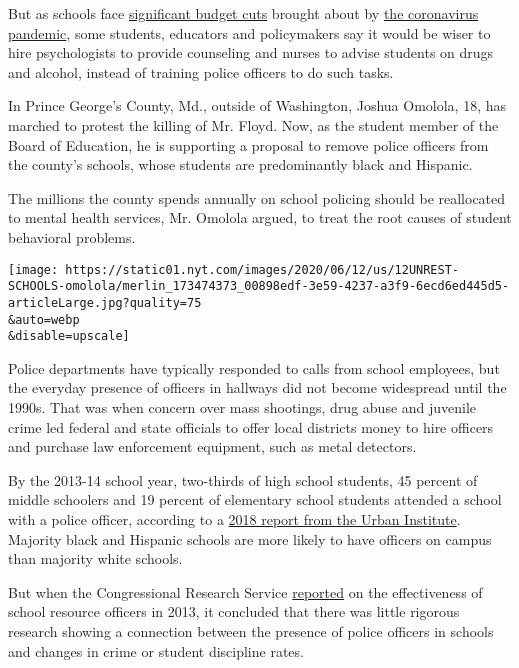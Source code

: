 But as schools face
\href{https://www.nytimes.com/2020/06/10/us/politics/virus-schools-funding-budget.html}{significant
budget cuts} brought about by
\href{https://www.nytimes.com/news-event/coronavirus}{the coronavirus
pandemic}, some students, educators and policymakers say it would be
wiser to hire psychologists to provide counseling and nurses to advise
students on drugs and alcohol, instead of training police officers to do
such tasks.

In Prince George's County, Md., outside of Washington, Joshua Omolola,
18, has marched to protest the killing of Mr. Floyd. Now, as the student
member of the Board of Education, he is supporting a proposal to remove
police officers from the county's schools, whose students are
predominantly black and Hispanic.

The millions the county spends annually on school policing should be
reallocated to mental health services, Mr. Omolola argued, to treat the
root causes of student behavioral problems.

\texttt{[image: https://static01.nyt.com/images/2020/06/12/us/12UNREST-SCHOOLS-omolola/merlin\_173474373\_00898edf-3e59-4237-a3f9-6ecd6ed445d5-articleLarge.jpg?quality=75\\\&auto=webp\\\&disable=upscale]}

Police departments have typically responded to calls from school
employees, but the everyday presence of officers in hallways did not
become widespread until the 1990s. That was when concern over mass
shootings, drug abuse and juvenile crime led federal and state officials
to offer local districts money to hire officers and purchase law
enforcement equipment, such as metal detectors.

By the 2013-14 school year, two-thirds of high school students, 45
percent of middle schoolers and 19 percent of elementary school students
attended a school with a police officer, according to a
\href{https://www.urban.org/urban-wire/prevalence-police-officers-us-schools\#:~:text=In\%20every\%20state\%2C\%20high\%20school,school\%20with\%20a\%20police\%20officer.}{2018
report from the Urban Institute}. Majority black and Hispanic schools
are more likely to have officers on campus than majority white schools.

But when the Congressional Research Service
\href{https://fas.org/sgp/crs/misc/R43126.pdf}{reported} on the
effectiveness of school resource officers in 2013, it concluded that
there was little rigorous research showing a connection between the
presence of police officers in schools and changes in crime or student
discipline rates.

